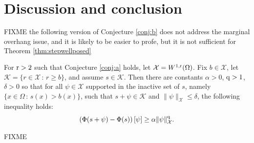 \documentclass[hidelinks,onefignum,onetabnum,final]{siamart220329}  %
\newcommand{\cK}{\mathcal{K}}
\newcommand{\cX}{\mathcal{X}}
\newcommand{\qq}{{\text{\textnormal{q}}}}
\newcommand{\rr}{{\text{\textnormal{r}}}}
\begin{document}
\section{Discussion and conclusion} \label{sec:conclusion}

FIXME the following version of Conjecture \ref{conj:b} does not address the marginal overhang issue, and it is likely to be easier to profe, but it is not sufficient for Theorem \ref{thm:stepwellposed}
\begin{conjecture} \label{conj:c}  For $\rr>2$ such that Conjecture \ref{conj:a} holds, let $\cX = W^{1,\rr}(\Omega)$.  Fix $b\in\cX$, let $\cK=\{r\in\cX\,:\,r\ge b\}$, and assume $s\in \cK$.  Then there are constants $\alpha>0$, $\qq>1$, $\delta>0$ so that for all $\psi\in\cX$ supported in the inactive set of $s$, namely $\{x\in\Omega\,:\,s(x)>b(x)\}$, such that $s+\psi\in\cK$ and $\|\psi\|_\cX \le \delta$, the following inequality holds:
\begin{equation}
\left(\Phi(s+\psi) - \Phi(s)\right)[\psi] \ge \alpha \|\psi\|_{\cX}^\qq. \label{eq:conj:c}
\end{equation}
\end{conjecture}

FIXME




\end{document}
